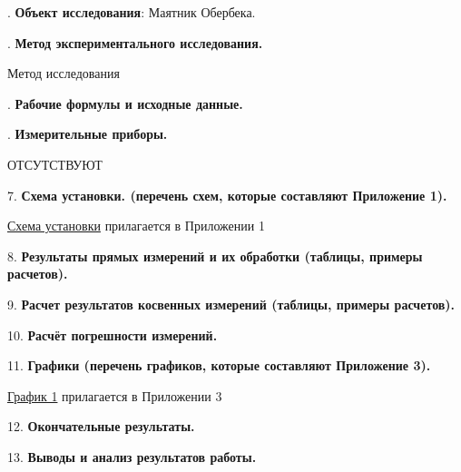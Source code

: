 \documentclass[12pt]{article}
\newcommand{\placeholder}[1]{{\color{magenta}#1}}
\begin{document}
    \mediumvspace

    . \textbf{Объект исследования}: Маятник Обербека.

    \mediumvspace

    . \textbf{Метод экспериментального исследования.}

    \placeholder{Метод исследования}

    \mediumvspace

    . \textbf{Рабочие формулы и исходные данные.}

    

    \mediumvspace

    \clearpage

    . \textbf{Измерительные приборы.}

    \smallvspace

    \placeholder{ОТСУТСТВУЮТ}

    \mediumvspace

    7. \textbf{Схема установки. (перечень схем, которые составляют Приложение 1).}

    \hyperlink{schema1}{Схема установки} прилагается в Приложении 1

    \mediumvspace

    8. \textbf{Результаты прямых измерений и их обработки (таблицы, примеры расчетов).}

    

    \mediumvspace

    9. \textbf{Расчет результатов косвенных измерений (таблицы, примеры расчетов).}

    

    \mediumvspace

    10. \textbf{Расчёт погрешности измерений.}

    \mediumvspace

    11. \textbf{Графики (перечень графиков, которые составляют Приложение 3).}

    \hyperlink{diagram1}{График 1} прилагается в Приложении 3

    \mediumvspace

    12. \textbf{Окончательные результаты.}

    

    \mediumvspace

    13. \textbf{Выводы и анализ результатов работы.}

    
\end{document}
